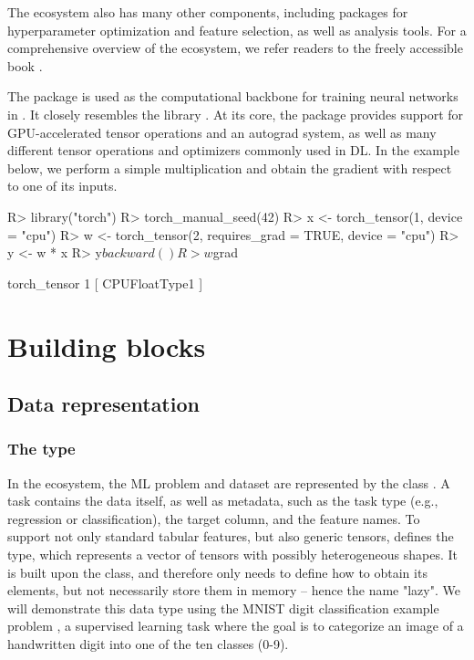 \documentclass[article]{jss}
\theoremstyle{definition}
\begin{document}
The  ecosystem also has many other components, including packages for hyperparameter optimization and feature selection, as well as analysis tools.
For a comprehensive overview of the  ecosystem, we refer readers to the freely accessible book \citep{ref-mlr3book}.

The  package is used as the computational backbone for training neural networks in .
It closely resembles the \pytorch{} \python{} library \citep{ref-pytorch}.
At its core, the package provides support for GPU-accelerated tensor operations and an autograd system, as well as many different tensor operations and optimizers commonly used in DL.
In the example below, we perform a simple multiplication and obtain the gradient with respect to one of its inputs.

\begin{CodeInput}
R> library("torch")
R> torch_manual_seed(42)
R> x <- torch_tensor(1, device = "cpu")
R> w <- torch_tensor(2, requires_grad = TRUE, device = "cpu")
R> y <- w * x
R> y$backward()
R> w$grad
\end{CodeInput}
\begin{CodeOutput}
torch_tensor
 1
[ CPUFloatType{1} ]
\end{CodeOutput}

\section{Building blocks}\label{sec:building-blocks}

\subsection{Data representation}

\subsubsection[The lazy tensor type]{The  type}

In the  ecosystem, the ML problem and dataset are represented by the  class .
A task contains the data itself, as well as metadata, such as the task type (e.g., regression or classification), the target column, and the feature names.
To support not only standard tabular features, but also generic \torch{} tensors,  defines the  type, which represents a vector of tensors with possibly heterogeneous shapes.
It is built upon the  class, and therefore only needs to define how to obtain its elements, but not necessarily store them in memory -- hence the name "lazy".
We will demonstrate this data type using the MNIST digit classification example problem \citep{ref-mnist-2012}, a supervised learning task where the goal is to categorize an image of a handwritten digit into one of the ten classes (0-9).
\end{document}
